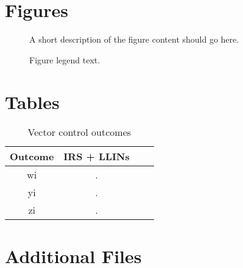 \documentclass{bmcart}
\begin{document}
\begin{backmatter}


\section*{Figures}
  \begin{figure}[h!]
  \caption{
      A short description of the figure content
      should go here.}
      \end{figure}

\begin{figure}[h!]
  \caption{
      Figure legend text.}
      \end{figure}


\section*{Tables}
\begin{table}[h!]
\caption{Vector control outcomes}
      \begin{tabular}{cccc}
        \hline
        Outcome & IRS + LLINs \\ \hline
        wi & .\\
        yi & .\\
        zi & .\\ \hline
      \end{tabular}
\end{table}


\section*{Additional Files}

\end{backmatter}
\end{document}
